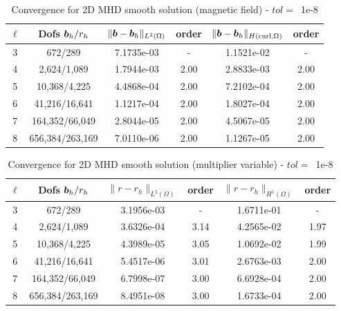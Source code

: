 \begin{table}[h!]
\begin{center}
\begin{tabular}{cccccc}
\hline
$\ell$ &    Dofs $\boldsymbol b_h/r_h$ & $\|\boldsymbol b-\boldsymbol b_h\|_{L^2(\Omega)}$ & order & $\|\boldsymbol b-\boldsymbol b_h\|_{H({\rm curl},\Omega)}$ & order \\
\hline
 3 &     672/289 &  7.1735e-03 &     - &  1.1521e-02 &        - \\
 4 &    2,624/1,089 &  1.7944e-03 &     2.00 &  2.8833e-03 &        2.00 \\
 5 &   10,368/4,225 &  4.4868e-04 &     2.00 &  7.2102e-04 &        2.00 \\
 6 &   41,216/16,641 &  1.1217e-04 &     2.00 &  1.8027e-04 &        2.00 \\
 7 &  164,352/66,049 &  2.8044e-05 &     2.00 &  4.5067e-05 &        2.00 \\
 8 &  656,384/263,169 &  7.0110e-06 &     2.00 &  1.1267e-05 &        2.00 \\
\hline
\end{tabular}
\caption{Convergence for 2D MHD smooth solution (magnetic field) - $tol=$~1e-8}
\label{tab:MHD_2D_smooth_magnetic}
\end{center}
\end{table}



\begin{table}[h!]
\begin{center}
\begin{tabular}{cccccc}
\hline
$\ell$ &    Dofs $\boldsymbol b_h/r_h$ & $\|{r}-{r}_h\|_{L^2(\Omega)}$ & order & $\|{r}-{r}_h\|_{H^1(\Omega)}$ & order\\
\hline
3 &         672/289 &  3.1956e-03 &     - &  1.6711e-01 &     - \\
4 &        2,624/1,089 &  3.6326e-04 &     3.14 &  4.2565e-02 &     1.97 \\
5 &       10,368/4,225 &  4.3989e-05 &     3.05 &  1.0692e-02 &     1.99 \\
6 &       41,216/16,641 &  5.4517e-06 &     3.01 &  2.6763e-03 &     2.00 \\
7 &     164,352/66,049 &  6.7998e-07 &     3.00 &  6.6928e-04 &     2.00 \\
8 &    656,384/263,169 &  8.4951e-08 &     3.00 &  1.6733e-04 &     2.00 \\
\hline
\end{tabular}
\caption{Convergence for 2D MHD smooth solution (multiplier variable) - $tol=$~1e-8}
\label{tab:MHD_2D_smooth_multiplier}
\end{center}
\end{table}

